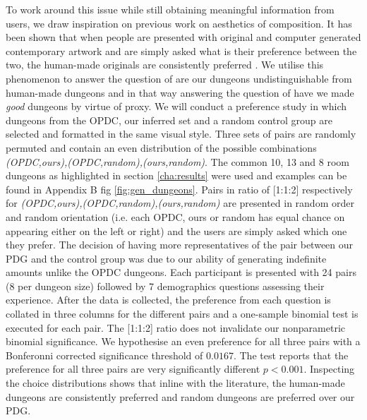 \documentclass{UoYCSproject}
\begin{document}

To work around this issue while still obtaining meaningful information from users, we draw inspiration on previous work on aesthetics of composition. It has been shown that when people are presented with original and computer generated contemporary artwork and are simply asked what is their preference between the two, the human-made originals are consistently preferred \parencite{McManusMondrian, FurnhamMondrian}. We utilise this phenomenon to answer the question of are our dungeons undistinguishable from human-made dungeons and in that way answering the question of have we made \textit{good} dungeons by virtue of proxy. We will conduct a preference study in which dungeons from the OPDC, our inferred set and a random control group are selected and formatted in the same visual style. Three sets of pairs are randomly permuted and contain an even distribution of the possible combinations \textit{(OPDC,ours),(OPDC,random),(ours,random)}.
The common 10, 13 and 8 room dungeons as highlighted in section \ref{cha:results} were used and examples can be found in Appendix B fig \ref{fig:gen_dungeons}. Pairs in ratio of [1:1:2] respectively for \textit{(OPDC,ours),(OPDC,random),(ours,random)} are presented in random order and random orientation (i.e. each OPDC, ours or random has equal chance on appearing either on the left or right) and the users are simply asked which one they prefer. The decision of having more representatives of the pair between our PDG and the control group was due to our ability of generating indefinite amounts unlike the OPDC dungeons. Each participant is presented with 24 pairs (8 per dungeon size) followed by 7 demographics questions assessing their experience. After the data is collected, the preference from each question is collated in three columns for the different pairs and a one-sample binomial test is executed for each pair. The [1:1:2] ratio does not invalidate our nonparametric binomial significance. We hypothesise an even preference for all three pairs with a Bonferonni corrected significance threshold of \(0.0167\). The test reports that the preference for all three pairs are very significantly different \(p < 0.001\). Inspecting the choice distributions shows that inline with the literature, the human-made dungeons are consistently preferred and random dungeons are preferred over our PDG.
\end{document}
